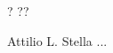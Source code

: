 \begin{participant}[type=PI,PM=8,gender=male,salary=2500]{? ??}

Attilio L. Stella ...

\end{participant}

